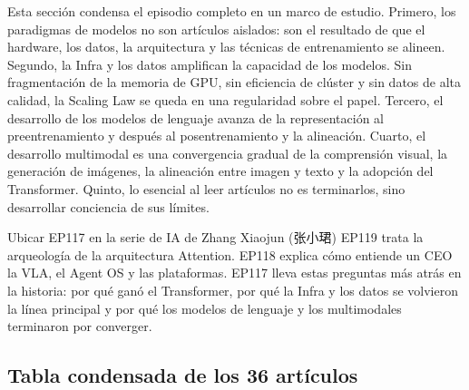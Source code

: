 \documentclass[a4paper]{article}
\begin{document}
Esta sección condensa el episodio completo en un marco de estudio. Primero, los paradigmas de modelos no son artículos aislados: son el resultado de que el hardware, los datos, la arquitectura y las técnicas de entrenamiento se alineen. Segundo, la Infra y los datos amplifican la capacidad de los modelos. Sin fragmentación de la memoria de GPU, sin eficiencia de clúster y sin datos de alta calidad, la Scaling Law se queda en una regularidad sobre el papel. Tercero, el desarrollo de los modelos de lenguaje avanza de la representación al preentrenamiento y después al posentrenamiento y la alineación. Cuarto, el desarrollo multimodal es una convergencia gradual de la comprensión visual, la generación de imágenes, la alineación entre imagen y texto y la adopción del Transformer. Quinto, lo esencial al leer artículos no es terminarlos, sino desarrollar conciencia de sus límites.

\begin{importantbox}{Ubicar EP117 en la serie de IA de Zhang Xiaojun (张小珺)}
EP119 trata la arqueología de la arquitectura Attention. EP118 explica cómo entiende un CEO la VLA, el Agent OS y las plataformas. EP117 lleva estas preguntas más atrás en la historia: por qué ganó el Transformer, por qué la Infra y los datos se volvieron la línea principal y por qué los modelos de lenguaje y los multimodales terminaron por converger.
\end{importantbox}

\subsection{Tabla condensada de los 36 artículos}
\end{document}
